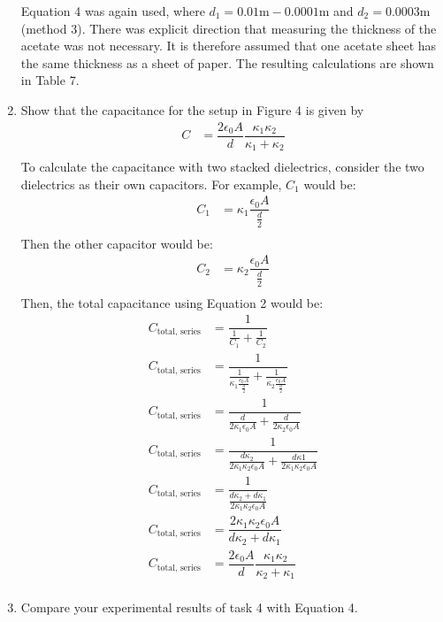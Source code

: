 \documentclass [12pt, letterpaper, twoside] {article}
\begin{document}
\begin{enumerate}
  Equation 4 was again used, where \(d_{1} = 0.01 \text{m} - 0.0001 \text{m}\) and \(d_{2} = 0.0003 \text{m}\) (method 3). There was explicit direction that measuring the thickness of the acetate was not necessary. It is therefore assumed that one acetate sheet has the same thickness as a sheet of paper. The resulting calculations are shown in Table 7.
  \item Show that the capacitance for the setup in Figure 4 is given by
  \begin{equation}
    \begin{split}
      C &= \dfrac{2\epsilon_{0}A}{d}\dfrac{\kappa_{1}\kappa_{2}}{\kappa_{1}+\kappa_{2}} \\
    \end{split}
\end{equation}
  To calculate the capacitance with two stacked dielectrics, consider the two dielectrics as their own capacitors. For example, \(C_{1}\) would be:
  \begin{equation*}
    \begin{split}
      C_{1} &= \kappa_{1}\dfrac{\epsilon_{0}A}{\tfrac{d}{2}} \\
    \end{split}
  \end{equation*}
  Then the other capacitor would be:
  \begin{equation*}
    \begin{split}
      C_{2} &= \kappa_{2}\dfrac{\epsilon_{0}A}{\tfrac{d}{2}} \\
    \end{split}
  \end{equation*}
  Then, the total capacitance using Equation 2 would be:
  \begin{equation*}
    \begin{split} 
      C_{\text{total, series}} &= \dfrac{1}{\tfrac{1}{C_{1}} + \tfrac{1}{C_{2}}} \\
      C_{\text{total, series}} &= \dfrac{1}{\tfrac{1}{\kappa_{1}\tfrac{\epsilon_{0}A}{\tfrac{d}{2}}} + \tfrac{1}{\kappa_{2}\tfrac{\epsilon_{0}A}{\tfrac{d}{2}}}} \\
      C_{\text{total, series}} &= \dfrac{1}{\tfrac{d}{2\kappa_{1}\epsilon_{0}A} + \tfrac{d}{2\kappa_{2}\epsilon_{0}A}} \\
      C_{\text{total, series}} &= \dfrac{1}{\tfrac{d\kappa_{2}}{2\kappa_{1}\kappa_{2}\epsilon_{0}A} + \tfrac{d\kappa{1}}{2\kappa_{1}\kappa_{2}\epsilon_{0}A}} \\
      C_{\text{total, series}} &= \dfrac{1}{\tfrac{d\kappa_{2} + d\kappa_{1}}{2\kappa_{1}\kappa_{2}\epsilon_{0}A}} \\
      C_{\text{total, series}} &= \dfrac{2\kappa_{1}\kappa_{2}\epsilon_{0}A}{d\kappa_{2} + d\kappa_{1}} \\
      C_{\text{total, series}} &= \dfrac{2\epsilon_{0}A}{d}\dfrac{\kappa_{1}\kappa_{2}}{\kappa_{2} + \kappa_{1}} \\
    \end{split}
  \end{equation*}
  \item Compare your experimental results of task 4 with Equation 4.


\end{enumerate}
\end{document}
